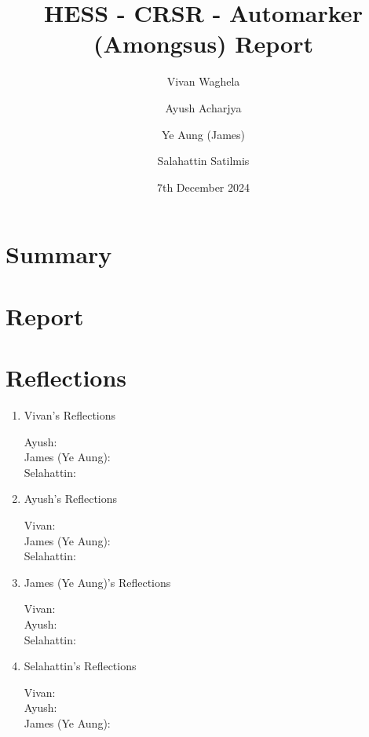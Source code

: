 \documentclass[a4paper, 12pt]{article}
\begin{document}
\title{HESS - CRSR - Automarker (Amongsus) Report}
\author{Vivan Waghela \and Ayush Acharjya \and Ye Aung (James) \and Salahattin Satilmis}
\date{7th December 2024}
\maketitle

\section*{Summary}

\section*{Report}

\section*{Reflections}
\begin{enumerate}
    \item Vivan's Reflections
        \begin{description}
            \item[Ayush: ] %
            \item[James (Ye Aung): ] %
            \item[Selahattin: ] %
        \end{description}
    \item Ayush's Reflections
        \begin{description}
            \item[Vivan: ] %
            \item[James (Ye Aung): ] %
            \item[Selahattin: ] %
        \end{description}
    \item James (Ye Aung)'s Reflections
        \begin{description}
            \item[Vivan: ] %
            \item[Ayush: ] %
            \item[Selahattin: ] %
        \end{description}
    \item Selahattin's Reflections
        \begin{description}
            \item[Vivan: ] %
            \item[Ayush: ] %
            \item[James (Ye Aung): ] %
        \end{description}
\end{enumerate}
\end{document}
